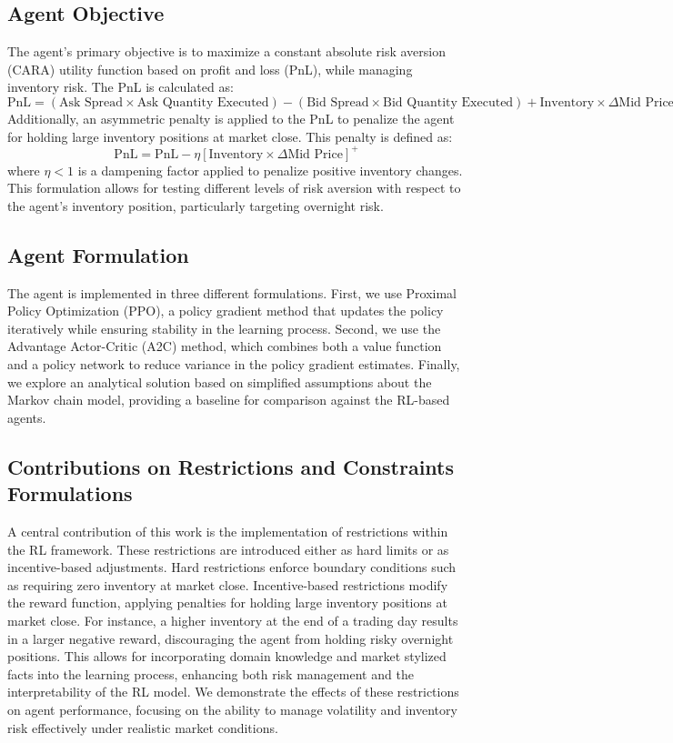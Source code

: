 \documentclass{article}
\begin{document}
\subsection{Agent Objective}
The agent’s primary objective is to maximize a constant absolute risk aversion (CARA) utility function based on profit and loss (PnL), while managing inventory risk. The PnL is calculated as:
\[
\text{PnL} = (\text{Ask Spread} \times \text{Ask Quantity Executed}) - (\text{Bid Spread} \times \text{Bid Quantity Executed}) + \text{Inventory} \times \Delta \text{Mid Price}
\]
Additionally, an asymmetric penalty is applied to the PnL to penalize the agent for holding large inventory positions at market close. This penalty is defined as:
\[
\text{PnL} = \text{PnL} - \eta [\text{Inventory} \times \Delta \text{Mid Price}]^+
\]
where \(\eta < 1\) is a dampening factor applied to penalize positive inventory changes. This formulation allows for testing different levels of risk aversion with respect to the agent's inventory position, particularly targeting overnight risk.

\subsection{Agent Formulation}
The agent is implemented in three different formulations. First, we use Proximal Policy Optimization (PPO), a policy gradient method that updates the policy iteratively while ensuring stability in the learning process. Second, we use the Advantage Actor-Critic (A2C) method, which combines both a value function and a policy network to reduce variance in the policy gradient estimates. Finally, we explore an analytical solution based on simplified assumptions about the Markov chain model, providing a baseline for comparison against the RL-based agents.

\subsection{Contributions on Restrictions and Constraints Formulations}
A central contribution of this work is the implementation of restrictions within the RL framework. These restrictions are introduced either as hard limits or as incentive-based adjustments. Hard restrictions enforce boundary conditions such as requiring zero inventory at market close. Incentive-based restrictions modify the reward function, applying penalties for holding large inventory positions at market close. For instance, a higher inventory at the end of a trading day results in a larger negative reward, discouraging the agent from holding risky overnight positions. This allows for incorporating domain knowledge and market stylized facts into the learning process, enhancing both risk management and the interpretability of the RL model. We demonstrate the effects of these restrictions on agent performance, focusing on the ability to manage volatility and inventory risk effectively under realistic market conditions.
\end{document}
